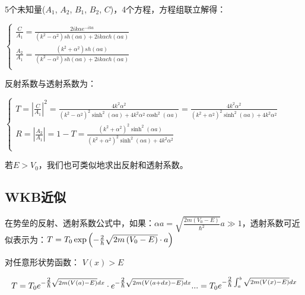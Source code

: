 5个未知量($A_1$, $A_2$, $B_1$, $B_2$, $C$)，4个方程，方程组联立解得：

\begin{center}
$\left\{ \begin{array}{l}
 \frac{C}{{A_1 }} = \frac{{2ik\alpha e^{ - ika} }}{{\left( {k^2  - \alpha ^2 } \right)sh\left( {\alpha a} \right) + 2ik\alpha ch\left( {\alpha a} \right)}} \\
 \frac{{A_2 }}{{A_1 }} = \frac{{\left( {k^2  + \alpha ^2 } \right)sh\left( {\alpha a} \right)}}{{\left( {k^2  - \alpha ^2 } \right)sh\left( {\alpha a} \right) + 2ik\alpha ch\left( {\alpha a} \right)}} \\
 \end{array} \right.$
\end{center}


反射系数与透射系数为：

\begin{center}
$\left\{ \begin{array}{l}
 T = \left| {\frac{C}{{A_1 }}} \right|^2  = \frac{{4k^2 \alpha ^2 }}{{\left( {k^2  - \alpha ^2 } \right)^2 \sinh ^2 \left( {\alpha a} \right) + 4k^2 \alpha ^2 \cosh ^2 \left( {\alpha a} \right)}} = \frac{{4k^2 \alpha ^2 }}{{\left( {k^2  + \alpha ^2 } \right)^2 \sinh ^2 \left( {\alpha a} \right) + 4k^2 \alpha ^2 }} \\
 R = \left| {\frac{{A_2 }}{{A_1 }}} \right| = 1 - T = \frac{{\left( {k^2  + \alpha ^2 } \right)^2 \sinh ^2 \left( {\alpha a} \right)}}{{\left( {k^2  + \alpha ^2 } \right)^2 \sinh ^2 \left( {\alpha a} \right) + 4k^2 \alpha ^2 }} \\
 \end{array} \right.$
\end{center}

若$E>V_0$，我们也可类似地求出反射和透射系数。

\subsection{WKB近似}


在势垒的反射、透射系数公式中，如果：$\alpha a = \sqrt {\frac{{2m\left( {V_0  - E} \right)}}{{\hbar ^2 }}} a \gg 1$，透射系数可近似表示为：$T = T_0 \exp \left( { - {\textstyle{2 \over \hbar }}\sqrt {2m\left( {V_0  - E} \right)}  \cdot a} \right)$


对任意形状势函数： $V(x)>E$

\begin{equation}\label{11-1}
T = T_0 e^{ - {\textstyle{2 \over \hbar }}\sqrt {2m\left( {V(a) - E} \right)} dx}  \cdot e^{ - {\textstyle{2 \over \hbar }}\sqrt {2m\left( {V(a + dx) - E} \right)} dx} ... = T_0 e^{ - {\textstyle{2 \over \hbar }}\int_a^b {\sqrt {2m\left( {V(x) - E} \right)} dx} }
\end{equation}

